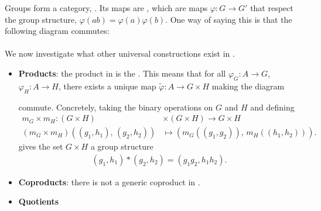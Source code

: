 \documentclass[11pt]{article}
\begin{document}
Groups form a category, . Its maps are ,
which are maps $\varphi \colon G \to G'$ that respect the group structure,
$\varphi(ab) = \varphi(a)\varphi(b)$. One way of saying this is that the
following diagram commutes:\\
\\
We now investigate what other universal constructions exist in . 
\begin{itemize}
    \item \textbf{Products}: the product in  is the . This means that for all $\varphi_G \colon A \to G$, $\varphi_{H} \colon A \to H$,
    there exists a unique map $\widetilde{\varphi} \colon A \to G \times H$
    making the diagram
    \begin{center}
    \end{center}
    commute. Concretely, taking the binary operations on $G$
    and $H$ and defining 
    \begin{align*}
        m_G \times m_H \colon (G \times H) & \times (G \times H) \to G \times H\\
        (m_G \times m_H)((g_1, h_1), \, (g_2, h_2)) & \mapsto (m_G((g_1, g_2)), \, m_H((h_1, h_2))).
    \end{align*}
    gives the set $G \times H$ a group structure
    \begin{align*}
        (g_1, h_1) * (g_2, h_2) = (g_1 g_2, h_1 h_2).
    \end{align*}
    \item \textbf{Coproducts}: there is not a generic coproduct in .
    \item \textbf{Quotients} 
\end{itemize}
\end{document}
